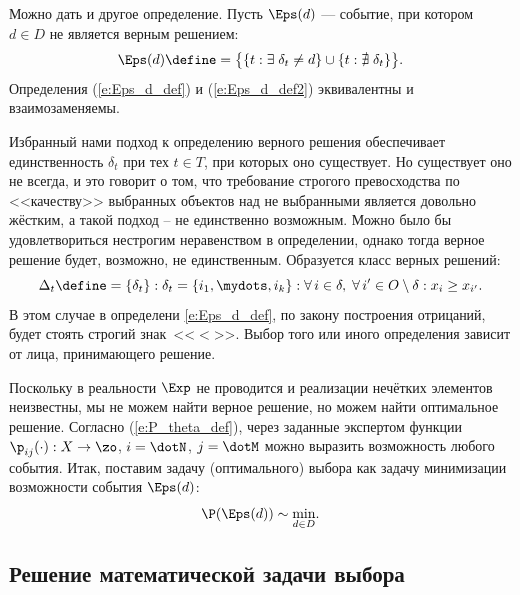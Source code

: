 Можно дать и другое определение. Пусть $\Eps(d)$ --- событие, при котором $d \in D$ не является верным решением:
\begin{equation}
  \label{e:Eps_d_def2}
  \Eps(d) \define= \big\{\{t: \exists\; \delta_{t} \neq d\} \cup \{t: \nexists\; \delta_{t}\}\big\}. 
\end{equation}
Определения (\ref{e:Eps_d_def}) и (\ref{e:Eps_d_def2}) эквивалентны и взаимозаменяемы.

\vspace*{1ex} \noticeheader
\begin{notice}
Избранный нами подход к определению верного решения обеспечивает единственность $\delta_{t}$ при тех $t \in T$, при которых оно существует. Но существует оно не всегда, и это говорит о том, что требование строгого превосходства по <<качеству>> выбранных объектов над не выбранными является довольно жёстким, а такой подход -- не единственно возможным. Можно было бы удовлетвориться нестрогим неравенством в определении, однако тогда верное решение будет, возможно, не единственным. Образуется класс верных решений:
 \begin{equation}
    \label{e:delta_def2}
    \Delta_{t} \define= \{\delta_{t}\}: \delta_{t} = \{i_1, \mydots, i_k\}: \forall\, i \in \delta,\; \forall\, i' \in O \setminus \delta: x_i \geq x_{i'}. 
\end{equation}
В этом случае в определени \eqref{e:Eps_d_def}, по закону построения отрицаний, будет стоять строгий знак~<<$<$>>. Выбор того или иного определения зависит от лица, принимающего решение. 
\end{notice}

Поскольку в реальности $\Exp$ не проводится и реализации нечётких элементов неизвестны, мы не можем найти верное решение, но можем найти оптимальное решение. Согласно (\ref{e:P_theta_def}), через заданные экспертом функции $\p_{ij}(\cdot): X \rightarrow \zo$, $i = \dotN$, $j = \dotM$ можно выразить возможность любого события.  Итак, поставим задачу (оптимального) выбора {} как задачу минимизации возможности события $\Eps(d)$:
\begin{equation}
  \label{e:zadacha}
  \P(\Eps(d)) \sim \underset{d \in D} \min.
\end{equation}

\subsection{Решение математической задачи выбора}


